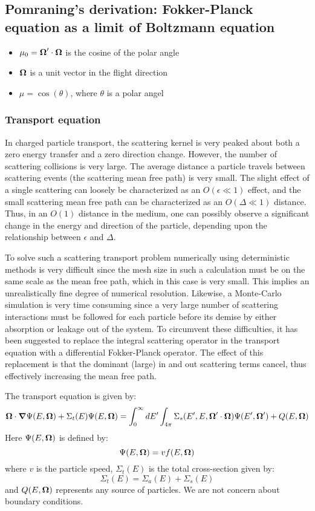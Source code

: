 \subsection{Pomraning's derivation: Fokker-Planck equation as a limit of
Boltzmann equation}
\begin{itemize}
\item $\mu_0 = \boldsymbol{\Omega}'\cdot \boldsymbol{\Omega}$ is the cosine of the polar angle
\item $\boldsymbol{\Omega}$ is a unit vector in the flight direction
\item $\mu = \cos(\theta)$, where $\theta$ is a polar angel
\end{itemize}
\subsubsection{Transport equation}
In charged particle transport, the scattering kernel is very peaked about both
a zero energy transfer and a zero direction change. However, the number of
scattering collisions is very large. The average distance a particle travels
between scattering events (the scattering mean free path) is very small. The
slight effect of a single scattering can loosely be characterized as an
$O(\epsilon \ll 1)$ effect, and the small scattering mean free path can be
characterized as an $O(\Delta \ll 1)$ distance. Thus, in an $O(1)$ distance in
the medium, one can possibly observe a significant change in the energy and
direction of the particle, depending upon the relationship between $\epsilon$
and $\Delta$\cite{pomraning}.

To solve such a scattering transport problem numerically using deterministic
methods is very difficult since the mesh size in such a calculation must be on
the same scale as the mean free path, which in this case is very small. This
implies an unrealistically fine degree of numerical resolution. Likewise, a
Monte-Carlo simulation is very time consuming since a very large number of
scattering interactions must be followed for each particle before its demise
by either absorption or leakage out of the system. To circumvent these
difficulties, it has been suggested to replace the integral scattering
operator in the transport equation with a differential Fokker-Planck operator.
The effect of this replacement is that the dominant (large) in and out
scattering terms cancel, thus effectively increasing the mean free
path\cite{pomraning}.

The transport equation is given by:
\begin{equation}
\boldsymbol{\Omega}\cdot \boldsymbol{\nabla} \Psi(E,\boldsymbol{\Omega}) + \Sigma_t(E)\Psi(E,\boldsymbol{\Omega}) =
\int_0^{\infty}dE'\int_{4\pi}
\Sigma_s(E',E,\boldsymbol{\Omega}'\cdot\boldsymbol{\Omega})\Psi(E',\boldsymbol{\Omega}')+Q(E,\boldsymbol{\Omega})
\label{transport_p}
\end{equation}
Here $\Psi(E,\boldsymbol{\Omega})$ is defined by:
\begin{equation}
\Psi(E,\boldsymbol{\Omega}) = vf(E,\boldsymbol{\Omega})
\end{equation}
where $v$ is the particle speed, $\Sigma_t(E)$ is the total cross-section
given by:
\begin{equation}
\Sigma_t(E) = \Sigma_a(E)+\Sigma_s(E)
\end{equation}
and $Q(E,\boldsymbol{\Omega})$ represents any source of particles. We are not concern about
boundary conditions.

